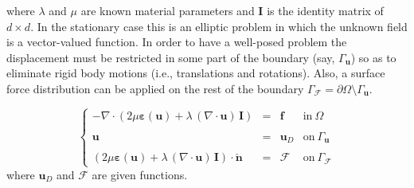 where $\lambda$ and $\mu$ are known material parameters and $\mathbf{I}$ is the identity matrix of $d\times d$.
In the stationary case this is an elliptic problem in which
the unknown field is a vector-valued function.
In order to have a well-posed problem the displacement
must be restricted in some part of the boundary (say, $\Gamma_{\mathbf{u}}$)
so as to eliminate rigid body motions (i.e., translations
and rotations). Also, a surface force distribution can be applied
on the rest of the boundary $\Gamma_{\boldsymbol{\mathcal{F}}} = \partial{\Omega} \setminus \Gamma_{\mathbf{u}}$.

\begin{equation}
\left \{
\begin{array}{rcll}
-\nabla \cdot \left ( 2\mu \boldsymbol{\varepsilon}(\mathbf{u}) + \lambda \, (\nabla\cdot\mathbf{u}) \, \mathbf{I}\right) & = & \mathbf{f} & \mbox{in}~\Omega \\
& & & \\
\mathbf{u} & = & \mathbf{u}_D & \mbox{on}~\Gamma_{\mathbf{u}} \\
& & & \\
(2 \mu \boldsymbol{\varepsilon}(\mathbf{u}) + \lambda \, (\nabla\cdot\mathbf{u})\,\mathbf{I})\cdot \check{\mathbf{n}} & = & \boldsymbol{\mathcal{F}} & \mbox{on}~\Gamma_{\boldsymbol{\mathcal{F}}}
\end{array}
\right.
\end{equation}
where $\mathbf{u}_D$ and $\boldsymbol{\mathcal{F}}$ are given functions.

